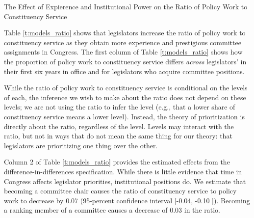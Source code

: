 \documentclass[12pt]{article}
\begin{document}
{\begin{table}
\begin{center}
\begin{minipage}{\textwidth}
\caption{The Effect of Expierence and Institutional Power on the Ratio of Policy Work to Constituency Service} \label{t:models_ratio}
\centering
\end{minipage}
\end{center}
\end{table}






Table \ref{t:models_ratio} shows that legislators increase the ratio of policy work to constituency service as they obtain more experience and prestigious committee assignments in Congress. The first column of Table \ref{t:models_ratio} shows how the proportion of policy work to constituency service differs \textit{across} legislators' in their first six years in office and for legislators who acquire committee positions. 

While the ratio of policy work to constituency service is conditional on the levels of each, the inference we wish to make about the ratio does not depend on these levels; we are not using the ratio to infer the level (e.g., that a lower share of constituency service means a lower level). Instead, the theory of prioritization is directly about the ratio, regardless of the level. Levels may interact with the ratio, but not in ways that do not mean the same thing for our theory: that legislators are prioritizing one thing over the other. 

Column 2 of Table \ref{t:models_ratio} provides the estimated effects from the difference-in-differences specification. While there is little evidence that time in Congress affects legislator priorities, institutional positions do. We estimate that becoming a committee chair causes the ratio of constituency service to policy work to decrease by 0.07 (95-percent confidence interval [-0.04, -0.10 ]). Becoming a ranking member of a committee causes a decrease of 0.03 in the ratio.


}
\end{document}
